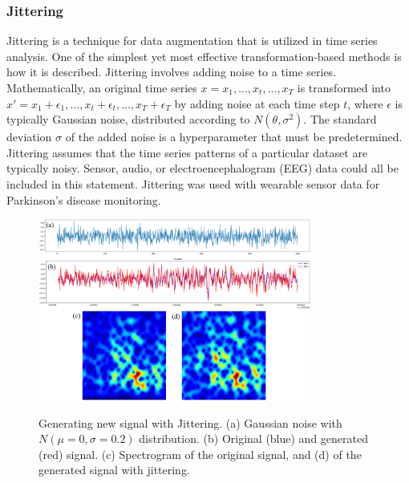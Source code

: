 \documentclass[journal]{IEEEtran}
\begin{document}
\subsubsection{Jittering}
Jittering is a technique for data augmentation that is utilized in time series analysis\cite{iwana2021empirical,iglesias2023data}. One of the simplest yet most effective transformation-based methods is how it is described. Jittering involves adding noise to a time series. 
Mathematically, an original time series $x={x_1,...,x_t,...,x_T}$ is transformed into $x'={x_1+\epsilon_1,...,x_t+\epsilon_t,...,x_T+\epsilon_T}$ by adding noise at each time step $t$, where $\epsilon$ is typically Gaussian noise, distributed according to $N(\theta,\sigma^2)$. The standard deviation $\sigma$ of the added noise is a hyperparameter that must be predetermined\cite{iwana2021empirical}.
Jittering assumes that the time series patterns of a particular dataset are typically noisy. Sensor, audio, or electroencephalogram (EEG) data could all be included in this statement. Jittering was used with wearable sensor data for Parkinson's disease monitoring.
\begin{figure}
\centering
{\includegraphics[width=0.8\textwidth,keepaspectratio]{img/da_jittering.png}}
\caption{Generating new signal with Jittering. (a) Gaussian noise with $N(\mu=0,\sigma=0.2)$ distribution. (b) Original (blue) and generated (red) signal. (c) Spectrogram of the original signal, and (d) of the generated signal with jittering.}
\label{fig:da_jittering}
\end{figure}
\end{document}
